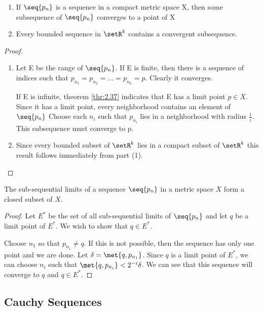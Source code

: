 \documentclass[12pt, letterpaper]{paper}
\begin{document}
\begin{theorem}
  \label{thr:3.6}
  \begin{enumerate}
  \item If $\seq{p_n}$ is a sequence in a compact metric space X, then
    some subsequence of $\seq{p_n}$ converges to a point of X
  \item Every bounded sequence in $\setR^k$ contains a convergent
    subsequence.
  \end{enumerate}
\end{theorem}
\begin{proof}
  \begin{enumerate}
  \item Let E be the range of $\seq{p_n}$. If E is finite, then there
    is a sequence of indices such that
    $p_{n_1} = p_{n_2} = ... = p_{n_k} = p$. Clearly it converges.

    If E is infinite, theorem \ref{thr:2.37} indicates that E has a
    limit point $p \in X$. Since it has a limit point, every
    neighborhood contains an element of $\seq{p_n}$ Choose each $n_i$
    such that $p_{n_i}$ lies in a neighborhood with radius
    $\frac{1}{i}$. This subsequence must converge to p.
  \item Since every bounded subset of $\setR^k$ lies in a compact
    subset of $\setR^k$ this result follows immediately from part (1).
  \end{enumerate}
\end{proof}

\begin{theorem}
  \label{thr:3.7}
  The sub-sequential limits of a sequence $\seq{p_n}$ in a metric
  space $X$ form a closed subset of $X$.
\end{theorem}
\begin{proof}
  Let $E^{*}$ be the set of all sub-sequential limits of $\seq{p_n}$
  and let $q$ be a limit point of $E^{*}$. We wish to show that
  $q \in E^{*}$.

  Choose $n_1$ so that $p_{n_1} \neq q$. If this is not possible, then
  the sequence has only one point and we are done. Let
  $\delta = \met{ q, p_{n_1}}$. Since $q$ is a limit point of $E^{*}$,
  we can choose $n_i$ such that $\met{q,p_{n_i}} < 2^{-i}\delta$. We
  can see that this sequence will converge to $q$ and $q \in E^{*}$.
\end{proof}

\subsection{Cauchy Sequences}
\label{sec:org6bbcfd8}
\end{document}
